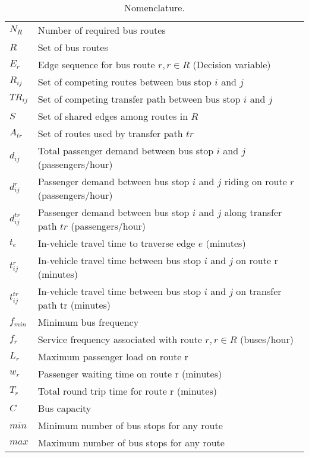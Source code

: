 \begin{table}[!htbp]
	\centering
	\caption{Nomenclature.} \label{tab:nomenclature}
	\begin{tabular}{ll}
		\hline
		$ N_R $     & Number of required bus routes  \\
		$ R $     & Set of bus routes  \\
		$ E_r $   & Edge sequence for bus route $ r, r\in R  $  (Decision variable)\\
		$ R_{ij} $  & Set of competing routes between bus stop $i$ and $j$\\
		$ TR_{ij} $ & Set of competing transfer path between bus stop $i$ and $j$\\
		$ S $     & Set of shared edges among routes in $ R $ \\
		$ A_{tr} $  & Set of routes used by transfer path $ tr $ \\
		$ d_{ij} $  & Total passenger demand between bus stop $i$ and $j$ (passengers/hour) \\
		$ d_{ij}^r $ & Passenger demand between bus stop $i$ and $j$ riding on route $ r $ (passengers/hour) \\
		$ d_{ij}^{tr} $ & Passenger demand between bus stop $i$ and $j$ along transfer path $ tr $ (passengers/hour) \\
		$ t_e $   & In-vehicle travel time to traverse edge $ e $ (minutes) \\
		$ t_{ij}^r $ & In-vehicle travel time between bus stop $i$ and $j$ on route r (minutes) \\
		$ t_{ij}^{tr} $ & In-vehicle travel time between bus stop $i$ and $j$ on transfer path tr (minutes) \\ %
		$ f_{min} $ & Minimum bus frequency \\
		$ f_r $   & Service frequency associated with route $ r, r\in R  $ (buses/hour) \\
		$ L_r $   & Maximum passenger load on route r \\
		$ w_r $   & Passenger waiting time on route r (minutes) \\
		$ T_r $   & Total round trip time for route r (minutes) \\
		$ C $     & Bus capacity \\
		$ min $     & Minimum number of bus stops for any route \\
		$ max $     & Maximum number of bus stops for any route \\
		\hline
	\end{tabular}%
	\label{tab:addlabel}%
\end{table}%

